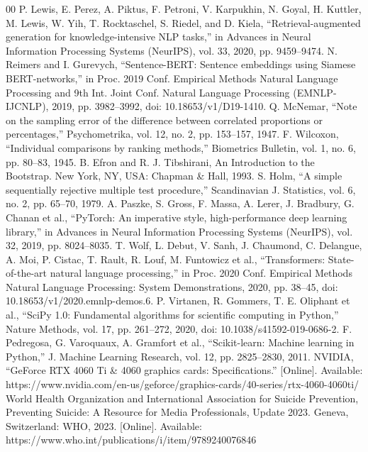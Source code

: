 \documentclass[conference]{IEEEtran}
\begin{document}
\begin{thebibliography}{00}
 P. Lewis, E. Perez, A. Piktus, F. Petroni, V. Karpukhin, N. Goyal, H. Kuttler, M. Lewis, W. Yih, T. Rocktaschel, S. Riedel, and D. Kiela, ``Retrieval-augmented generation for knowledge-intensive NLP tasks,'' in Advances in Neural Information Processing Systems (NeurIPS), vol. 33, 2020, pp. 9459--9474.
 N. Reimers and I. Gurevych, ``Sentence-BERT: Sentence embeddings using Siamese BERT-networks,'' in Proc. 2019 Conf. Empirical Methods Natural Language Processing and 9th Int. Joint Conf. Natural Language Processing (EMNLP-IJCNLP), 2019, pp. 3982--3992, doi: 10.18653/v1/D19-1410.
 Q. McNemar, ``Note on the sampling error of the difference between correlated proportions or percentages,'' Psychometrika, vol. 12, no. 2, pp. 153--157, 1947.
 F. Wilcoxon, ``Individual comparisons by ranking methods,'' Biometrics Bulletin, vol. 1, no. 6, pp. 80--83, 1945.
 B. Efron and R. J. Tibshirani, An Introduction to the Bootstrap. New York, NY, USA: Chapman \& Hall, 1993.
 S. Holm, ``A simple sequentially rejective multiple test procedure,'' Scandinavian J. Statistics, vol. 6, no. 2, pp. 65--70, 1979.
 A. Paszke, S. Gross, F. Massa, A. Lerer, J. Bradbury, G. Chanan et al., ``PyTorch: An imperative style, high-performance deep learning library,'' in Advances in Neural Information Processing Systems (NeurIPS), vol. 32, 2019, pp. 8024--8035.
 T. Wolf, L. Debut, V. Sanh, J. Chaumond, C. Delangue, A. Moi, P. Cistac, T. Rault, R. Louf, M. Funtowicz et al., ``Transformers: State-of-the-art natural language processing,'' in Proc. 2020 Conf. Empirical Methods Natural Language Processing: System Demonstrations, 2020, pp. 38--45, doi: 10.18653/v1/2020.emnlp-demos.6.
 P. Virtanen, R. Gommers, T. E. Oliphant et al., ``SciPy 1.0: Fundamental algorithms for scientific computing in Python,'' Nature Methods, vol. 17, pp. 261--272, 2020, doi: 10.1038/s41592-019-0686-2.
 F. Pedregosa, G. Varoquaux, A. Gramfort et al., ``Scikit-learn: Machine learning in Python,'' J. Machine Learning Research, vol. 12, pp. 2825--2830, 2011.
 NVIDIA, ``GeForce RTX 4060 Ti \& 4060 graphics cards: Specifications.'' [Online]. Available: https://www.nvidia.com/en-us/geforce/graphics-cards/40-series/rtx-4060-4060ti/
 World Health Organization and International Association for Suicide Prevention, Preventing Suicide: A Resource for Media Professionals, Update 2023. Geneva, Switzerland: WHO, 2023. [Online]. Available: https://www.who.int/publications/i/item/9789240076846
\end{thebibliography}
\end{document}
